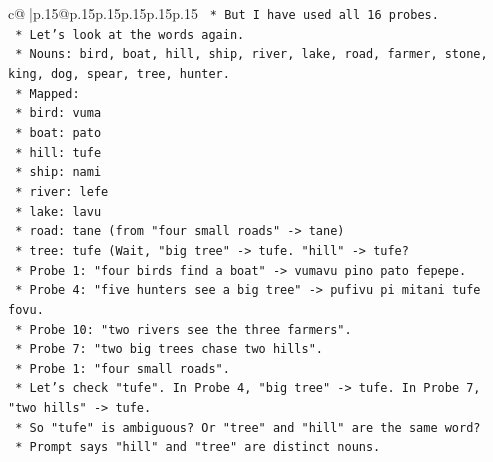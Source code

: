 \documentclass{article}
\begin{document}
{\begin{supertabular}{c@{$\;$}|p{.15\linewidth}@{}p{.15\linewidth}p{.15\linewidth}p{.15\linewidth}p{.15\linewidth}p{.15\linewidth}}
{{{\texttt{                                    *   But I have used all 16 probes.} \\
\texttt{                                    *   Let's look at the words again.} \\
\texttt{                                    *   Nouns: bird, boat, hill, ship, river, lake, road, farmer, stone, king, dog, spear, tree, hunter.} \\
\texttt{                                    *   Mapped:} \\
\texttt{                                        *   bird: vuma} \\
\texttt{                                        *   boat: pato} \\
\texttt{                                        *   hill: tufe} \\
\texttt{                                        *   ship: nami} \\
\texttt{                                        *   river: lefe} \\
\texttt{                                        *   lake: lavu} \\
\texttt{                                        *   road: tane (from "four small roads" {-}> tane)} \\
\texttt{                                        *   tree: tufe (Wait, "big tree" {-}> tufe. "hill" {-}> tufe?} \\
\texttt{                                        *   Probe 1: "four birds find a boat" {-}> vumavu pino pato fepepe.} \\
\texttt{                                        *   Probe 4: "five hunters see a big tree" {-}> pufivu pi mitani tufe fovu.} \\
\texttt{                                        *   Probe 10: "two rivers see the three farmers".} \\
\texttt{                                        *   Probe 7: "two big trees chase two hills".} \\
\texttt{                                        *   Probe 1: "four small roads".} \\
\texttt{                                        *   Let's check "tufe". In Probe 4, "big tree" {-}> tufe. In Probe 7, "two hills" {-}> tufe.} \\
\texttt{                                        *   So "tufe" is ambiguous? Or "tree" and "hill" are the same word?} \\
\texttt{                                        *   Prompt says "hill" and "tree" are distinct nouns.} \\
}}}
\end{supertabular}}
\end{document}
